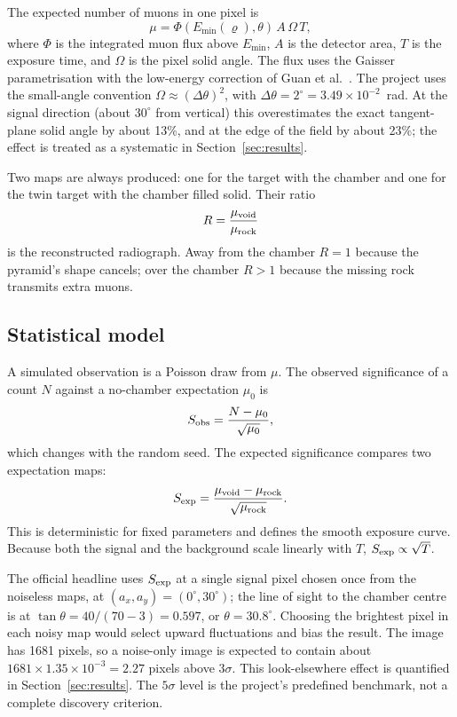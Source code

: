 \documentclass{article}
\begin{document}
The expected number of muons in one pixel is
\begin{equation}
\mu=\Phi(E_{\min}(\varrho),\theta)\,A\,\Omega\,T,
\label{eq:counts}
\end{equation}
where $\Phi$ is the integrated muon flux above $E_{\min}$, $A$ is the detector
area, $T$ is the exposure time, and $\Omega$ is the pixel solid angle. The flux
uses the Gaisser parametrisation \cite{gaisser1990} with the low-energy
correction of Guan et al.\ \cite{guan2015}. The project uses the small-angle
convention $\Omega\approx(\Delta\theta)^2$, with
$\Delta\theta=2^\circ=3.49\times10^{-2}$~rad. At the signal direction (about
$30^\circ$ from vertical) this overestimates the exact tangent-plane solid
angle by about 13\%, and at the edge of the field by about 23\%; the effect is
treated as a systematic in Section~\ref{sec:results}.

Two maps are always produced: one for the target with the chamber and one for
the twin target with the chamber filled solid. Their ratio
\begin{equation}
R=\frac{\mu_{\rm void}}{\mu_{\rm rock}}
\label{eq:ratio}
\end{equation}
is the reconstructed radiograph. Away from the chamber $R=1$ because the
pyramid's shape cancels; over the chamber $R>1$ because the missing rock
transmits extra muons.

\subsection{Statistical model}

A simulated observation is a Poisson draw from $\mu$. The observed significance
of a count $N$ against a no-chamber expectation $\mu_0$ is
\begin{equation}
S_{\rm obs}=\frac{N-\mu_0}{\sqrt{\mu_0}},
\label{eq:sobs}
\end{equation}
which changes with the random seed. The expected significance compares two
expectation maps:
\begin{equation}
S_{\rm exp}=\frac{\mu_{\rm void}-\mu_{\rm rock}}{\sqrt{\mu_{\rm rock}}}.
\label{eq:sexp}
\end{equation}
This is deterministic for fixed parameters and defines the smooth exposure
curve. Because both the signal and the background scale linearly with $T$,
$S_{\rm exp}\propto\sqrt{T}$.

The official headline uses $S_{\rm exp}$ at a single signal pixel chosen once
from the noiseless maps, at $(a_x,a_y)=(0^\circ,30^\circ)$; the line of sight
to the chamber centre is at
$\tan\theta=40/(70-3)=0.597$, or $\theta=30.8^\circ$. Choosing the brightest
pixel in each noisy map would select upward fluctuations and bias the result.
The image has 1681 pixels, so a noise-only image is expected to contain about
$1681\times1.35\times10^{-3}=2.27$ pixels above $3\sigma$. This look-elsewhere
effect is quantified in Section~\ref{sec:results}. The $5\sigma$ level is the
project's predefined benchmark, not a complete discovery criterion.
\end{document}
